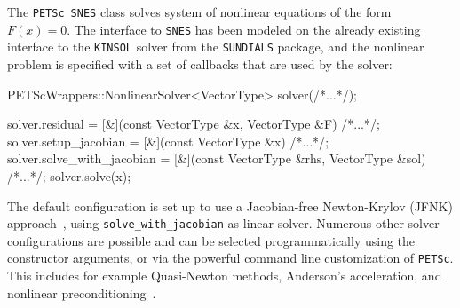\documentclass{ansarticle-preprint}
\newcommand{\specialword}[1]{\texttt{#1}}
\newcommand{\petsc}{\specialword{PETSc}\xspace}
\newcommand{\snes}{{\specialword{SNES}}\xspace}
\newcommand{\sundials}{{\specialword{SUNDIALS}}\xspace}
\newcommand{\kinsol}{{\specialword{KINSOL}}\xspace}
\begin{document}
The \petsc~\snes class solves system of nonlinear equations of the form $F(x) = 0$.
The interface to \snes has been modeled on the already existing interface
to the \kinsol solver from the \sundials package, and the nonlinear problem
is specified with a set of callbacks that are used by the solver:
\begin{c++}
PETScWrappers::NonlinearSolver<VectorType> solver(/*...*/);

solver.residual            = [&](const VectorType &x,
                                 VectorType       &F) {/*...*/};
solver.setup_jacobian      = [&](const VectorType &x) {/*...*/};
solver.solve_with_jacobian = [&](const VectorType &rhs,
                                 VectorType       &sol) {/*...*/};
solver.solve(x);
\end{c++}
The default configuration is set up to use a Jacobian-free Newton-Krylov (JFNK)
approach~\cite{knoll2004jacobian}, using \texttt{solve\_with\_jacobian} as linear solver.
Numerous other solver configurations are possible and can be selected
programmatically using the constructor arguments,
or via the powerful command line customization of \petsc.
This includes for example Quasi-Newton methods, Anderson's acceleration, and
nonlinear preconditioning~\cite{brune2015composing}.
\end{document}
